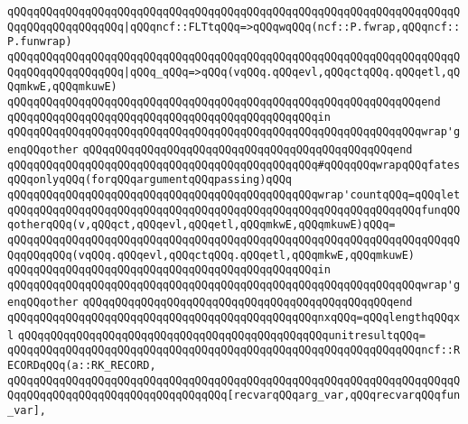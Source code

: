 \verb|qQQqqQQqqQQqqQQqqQQqqQQqqQQqqQQqqQQqqQQqqQQqqQQqqQQqqQQqqQQqqQQqqQQqqQQqqQQqqQQqqQQqqQQq|\verb#|qQQqncf::FLTtqQQq=>qQQqwqQQq(ncf::P.fwrap,qQQqncf::P.funwrap)#\newline
\verb|qQQqqQQqqQQqqQQqqQQqqQQqqQQqqQQqqQQqqQQqqQQqqQQqqQQqqQQqqQQqqQQqqQQqqQQqqQQqqQQqqQQqqQQq|\verb#|qQQq_qQQq=>qQQq(vqQQq.qQQqevl,qQQqctqQQq.qQQqetl,qQQqmkwE,qQQqmkuwE)#\newline
\verb|qQQqqQQqqQQqqQQqqQQqqQQqqQQqqQQqqQQqqQQqqQQqqQQqqQQqqQQqqQQqqQQqend|\newline
\verb|qQQqqQQqqQQqqQQqqQQqqQQqqQQqqQQqqQQqqQQqqQQqqQQqin|\newline
\verb|qQQqqQQqqQQqqQQqqQQqqQQqqQQqqQQqqQQqqQQqqQQqqQQqqQQqqQQqqQQqqQQqwrap'genqQQqother|\newline
\verb|qQQqqQQqqQQqqQQqqQQqqQQqqQQqqQQqqQQqqQQqqQQqqQQqend|\newline
\newline
\verb|qQQqqQQqqQQqqQQqqQQqqQQqqQQqqQQqqQQqqQQqqQQqqQQq#qQQqqQQqwrapqQQqfatesqQQqonlyqQQq(forqQQqargumentqQQqpassing)qQQq|\newline
\verb|qQQqqQQqqQQqqQQqqQQqqQQqqQQqqQQqqQQqqQQqqQQqqQQqwrap'countqQQq=qQQqlet|\newline
\verb|qQQqqQQqqQQqqQQqqQQqqQQqqQQqqQQqqQQqqQQqqQQqqQQqqQQqqQQqqQQqqQQqfunqQQqotherqQQq(v,qQQqct,qQQqevl,qQQqetl,qQQqmkwE,qQQqmkuwE)qQQq=|\newline
\verb|qQQqqQQqqQQqqQQqqQQqqQQqqQQqqQQqqQQqqQQqqQQqqQQqqQQqqQQqqQQqqQQqqQQqqQQqqQQqqQQq(vqQQq.qQQqevl,qQQqctqQQq.qQQqetl,qQQqmkwE,qQQqmkuwE)|\newline
\verb|qQQqqQQqqQQqqQQqqQQqqQQqqQQqqQQqqQQqqQQqqQQqqQQqin|\newline
\verb|qQQqqQQqqQQqqQQqqQQqqQQqqQQqqQQqqQQqqQQqqQQqqQQqqQQqqQQqqQQqqQQqwrap'genqQQqother|\newline
\verb|qQQqqQQqqQQqqQQqqQQqqQQqqQQqqQQqqQQqqQQqqQQqqQQqend|\newline
\newline
\verb|qQQqqQQqqQQqqQQqqQQqqQQqqQQqqQQqqQQqqQQqqQQqqQQqnxqQQq=qQQqlengthqQQqxl|\newline
\verb|qQQqqQQqqQQqqQQqqQQqqQQqqQQqqQQqqQQqqQQqqQQqqQQqunitresultqQQq=|\newline
\verb|qQQqqQQqqQQqqQQqqQQqqQQqqQQqqQQqqQQqqQQqqQQqqQQqqQQqqQQqqQQqqQQqncf::RECORDqQQq(a::RK_RECORD,|\newline
\verb|qQQqqQQqqQQqqQQqqQQqqQQqqQQqqQQqqQQqqQQqqQQqqQQqqQQqqQQqqQQqqQQqqQQqqQQqqQQqqQQqqQQqqQQqqQQqqQQqqQQqqQQq[recvarqQQqarg_var,qQQqrecvarqQQqfun_var],|\newline
